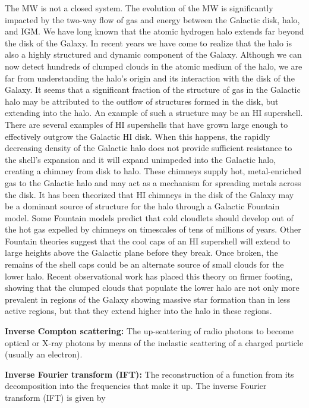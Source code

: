 \documentclass[a4paper,10pt]{article}
\begin{document}
{\noindent}The MW is not a closed system. The evolution of the MW is significantly impacted by the two-way flow of gas and energy between the Galactic disk, halo, and IGM. We have long known that the atomic hydrogen halo extends far beyond the disk of the Galaxy. In recent years we have come to realize that the halo is also a highly structured and dynamic component of the Galaxy. Although we can now detect hundreds of clumped clouds in the atomic medium of the halo, we are far from understanding the halo's origin and its interaction with the disk of the Galaxy. It seems that a significant fraction of the structure of gas in the Galactic halo may be attributed to the outflow of structures formed in the disk, but extending into the halo. An example of such a structure may be an HI supershell. There are several examples of HI supershells that have grown large enough to effectively outgrow the Galactic HI disk. When this happens, the rapidly decreasing density of the Galactic halo does not provide sufficient resistance to the shell's expansion and it will expand unimpeded into the Galactic halo, creating a chimney from disk to halo. These chimneys supply hot, metal-enriched gas to the Galactic halo and may act as a mechanism for spreading metals across the disk. It has been theorized that HI chimneys in the disk of the Galaxy may be a dominant source of structure for the halo through a Galactic Fountain model. Some Fountain models predict that cold cloudlets should develop out of the hot gas expelled by chimneys on timescales of tens of millions of years. Other Fountain theories suggest that the cool caps of an HI supershell will extend to large heights above the Galactic plane before they break. Once broken, the remains of the shell caps could be an alternate source of small clouds for the lower halo. Recent observational work has placed this theory on firmer footing, showing that the clumped clouds that populate the lower halo are not only more prevalent in regions of the Galaxy showing massive star formation than in less active regions, but that they extend higher into the halo in these regions. 

{\noindent}\textbf{Inverse Compton scattering:} The up-scattering of radio photons to become optical or X-ray photons by means of the inelastic scattering of a charged particle (usually an electron).

{\noindent}\textbf{Inverse Fourier transform (IFT):} The reconstruction of a function from its decomposition into the frequencies that make it up. The inverse Fourier transform (IFT) is given by
\end{document}
